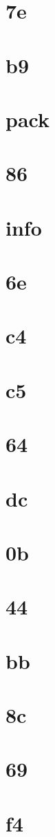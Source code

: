 \documentclass{article}
\begin{document}
\section{7e}
\section{b9}
\section{pack}
\section{86}
\section{info}
\section{6e}
\section{c4}
\section{c5}
\section{64}
\section{dc}
\section{0b}
\section{44}
\section{bb}
\section{8c}
\section{69}
\section{f4}
\end{document}
